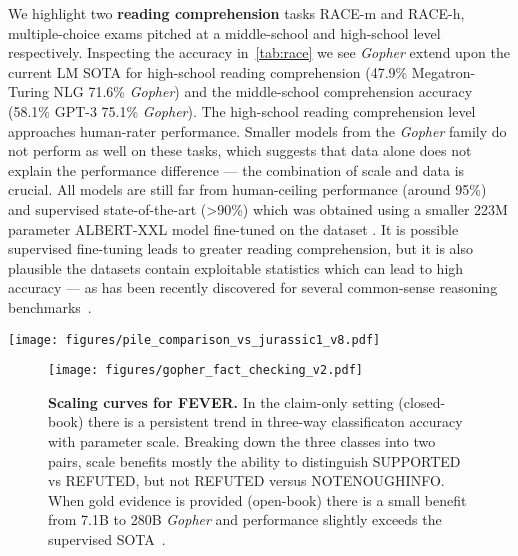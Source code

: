 \documentclass[11pt, a4paper, logo, internal, copyright, nonumbering]{deepmind}
\newcommand{\gopher}{\textit{Gopher}\xspace}
\begin{document}
We highlight two \textbf{reading comprehension} tasks RACE-m and RACE-h, multiple-choice exams pitched at a middle-school and high-school level respectively. Inspecting the accuracy in~\autoref{tab:race} we see \gopher extend upon the current LM SOTA for high-school reading comprehension (47.9\% Megatron-Turing NLG  71.6\% \gopher) and the middle-school comprehension accuracy (58.1\% GPT-3  75.1\% \gopher). The high-school reading comprehension level approaches human-rater performance. Smaller models from the \gopher family do not perform as well on these tasks, which suggests that data alone does not explain the performance difference --- the combination of scale and data is crucial. All models are still far from human-ceiling performance (around 95\%) and supervised state-of-the-art (>90\%) which was obtained using a smaller 223M parameter ALBERT-XXL model fine-tuned on the dataset \citep{race-sota}. It is possible supervised fine-tuning leads to greater reading comprehension, but it is also plausible the datasets contain exploitable statistics which can lead to high accuracy --- as has been recently discovered for several common-sense reasoning benchmarks~\citep{li2021systematic}.

\begin{figure*}[t]
    \centering
    \texttt{[image: figures/pile\_comparison\_vs\_jurassic1\_v8.pdf]}
    \caption{\textbf{Language Modelling Comparisons with SOTA.} Comparison of \gopher to the current SOTA models on various language modelling tasks, including many from The Pile \citep{pile}. The superscript (1) indicates the prior SOTA was Jurassic-1 and (2) indicates GPT-3. \gopher achieves state-of-the-art performance on 11 out of 19 datasets with the largest improvements on books and articles.
    }
    \label{fig:pile_gopher}
\end{figure*}
\begin{figure}[h!]
\centering
\texttt{[image: figures/gopher\_fact\_checking\_v2.pdf]}
\caption{\textbf{Scaling curves for FEVER.} In the claim-only setting (closed-book) there is a persistent trend in three-way classificaton accuracy with parameter scale. Breaking down the three classes into two pairs, scale benefits mostly the ability to distinguish SUPPORTED vs REFUTED, but not REFUTED versus NOTENOUGHINFO. When gold evidence is provided (open-book) there is a small benefit from 7.1B to 280B \gopher and performance slightly exceeds the supervised SOTA~\citep{kruengkrai2021multi}.} 
\label{fig:fever}
\end{figure}
\end{document}

